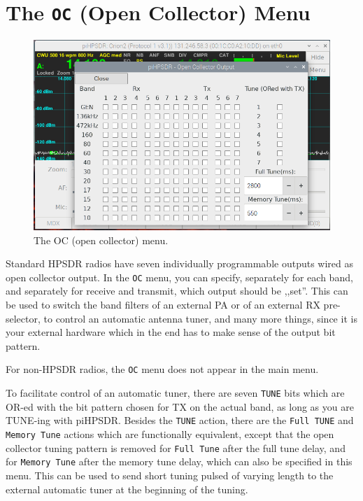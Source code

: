 \documentclass[12pt]{book}
\def\rett#1{\texttt{\color{red}#1}}
\def\bltt#1{\texttt{\color{blue}#1}}
\def\pH{pi\-HPSDR\xspace}
\begin{document}
\section{The \texttt{OC} (Open Collector) Menu}

\begin{figure}[ht]
\center
\includegraphics[width=12cm]{OCMenu.png}
\caption{The OC (open collector) menu.}
\label{fig:OCMenu}
\end{figure}

Standard HPSDR radios have seven individually programmable outputs wired as
open collector output. In the \bltt{OC} menu, you can specify, separately
for each band, and separately for receive and transmit, which output should
be ,,set''. This can be used to switch the band filters of an external PA
or of an external RX pre-selector, to control an automatic antenna tuner,
and many more things, since it is
your external hardware which in the end has to make sense of the output
bit pattern.

For non-HPSDR radios, the \bltt{OC} menu does not appear in the main menu.

To facilitate control of an automatic tuner, there are seven \rett{TUNE}
bits which are OR-ed with the bit pattern chosen for TX on the actual band,
as long as you are TUNE-ing with \pH. Besides the \bltt{TUNE} action,
there are the \bltt{Full TUNE} and \bltt{Memory Tune} actions which are
functionally equivalent, except that the open collector tuning pattern
is removed for \bltt{Full Tune} after the full tune delay, and for \bltt{Memory Tune}
after the memory tune delay, which can also be specified in this menu.
This can be used to send short tuning pulsed of varying length to the
external automatic tuner at the beginning of the tuning.
\end{document}
